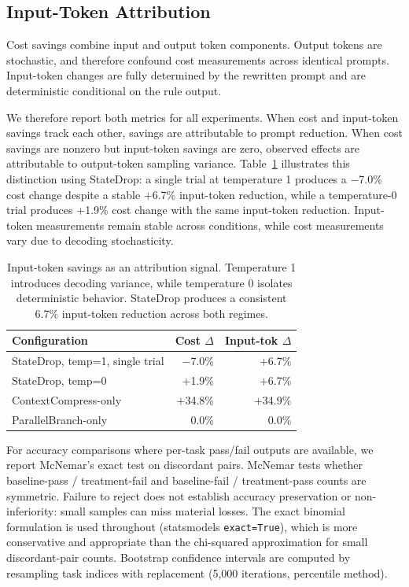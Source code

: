 \subsection{Input-Token Attribution}

Cost savings combine input and output token components. Output tokens are stochastic,
and therefore confound cost measurements across identical prompts. Input-token changes
are fully determined by the rewritten prompt and are deterministic conditional on the
rule output.

We therefore report both metrics for all experiments. When cost and input-token
savings track each other, savings are attributable to prompt reduction. When cost
savings are nonzero but input-token savings are zero, observed effects are attributable
to output-token sampling variance. Table~\ref{tab:attribution} illustrates this
distinction using StateDrop: a single trial at temperature 1 produces a $-$7.0\% cost
change despite a stable $+$6.7\% input-token reduction, while a temperature-0 trial
produces $+$1.9\% cost change with the same input-token reduction. Input-token
measurements remain stable across conditions, while cost measurements vary due to
decoding stochasticity.

\begin{table}[t]
\caption{Input-token savings as an attribution signal. Temperature 1 introduces
decoding variance, while temperature 0 isolates deterministic behavior. StateDrop
produces a consistent 6.7\% input-token reduction across both regimes.}
\label{tab:attribution}
\small
\begin{tabular}{lrr}
\toprule
Configuration & Cost $\Delta$ & Input-tok $\Delta$ \\
\midrule
StateDrop, temp=1, single trial  & $-$7.0\% & $+$6.7\% \\
StateDrop, temp=0                & $+$1.9\% & $+$6.7\% \\
ContextCompress-only             & $+$34.8\% & $+$34.9\% \\
ParallelBranch-only              & $0.0\%$  & $0.0\%$ \\
\bottomrule
\end{tabular}
\end{table}

For accuracy comparisons where per-task pass/fail outputs are available, we report
McNemar's exact test on discordant pairs. McNemar tests whether baseline-pass /
treatment-fail and baseline-fail / treatment-pass counts are symmetric. Failure to
reject does not establish accuracy preservation or non-inferiority: small samples
can miss material losses. The exact binomial formulation is used throughout
(statsmodels \texttt{exact=True}), which is more conservative and appropriate than the
chi-squared approximation for small discordant-pair counts. Bootstrap confidence
intervals are computed by resampling task indices with replacement (5{,}000
iterations, percentile method).

